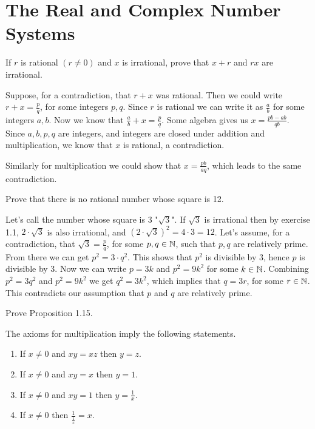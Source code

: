 \section{The Real and Complex Number Systems}

\begin{problem}
  If $r$ is rational $(r \neq 0)$ and $x$ is irrational, prove that $x + r$ and $rx$ are irrational.
\end{problem}

\begin{solution}
  Suppose, for a contradiction, that $r + x$ was rational.
  Then we could write $r + x = \frac{p}{q}$, for some integers $p,q$.
  Since $r$ is rational we can write it as $\frac{a}{b}$ for some integers $a,b$.
  Now we know that $\frac{a}{b} + x = \frac{p}{q}$.
  Some algebra gives us $x=\frac{pb-ab}{qb}$.
  Since $a, b, p, q$ are integers, and integers are closed under addition and multiplication, we know that $x$ is rational, a contradiction.

  Similarly for multiplication we could show that $x=\frac{pb}{aq}$, which leads to the same contradiction.
\end{solution}

\begin{problem}
  Prove that there is no rational number whose square is 12.
\end{problem}

\begin{solution}
  Let's call the number whose square is $3$ "$\sqrt{3}$".
  If $\sqrt{3}$ is irrational then by exercise 1.1, $2 \cdot \sqrt{3}$ is also irrational, and $(2 \cdot \sqrt{3})^2 = 4 \cdot 3 = 12$.
  Let's assume, for a contradiction, that $\sqrt{3} = \frac{p}{q}$, for some $p,q \in \mathbb{N}$, such that $p,q$ are relatively prime.
  From there we can get $p^2 = 3 \cdot q^2$. This shows that $p^2$ is divisible by $3$, hence $p$ is divisible by 3. Now we can write $p = 3k$ and $p^2 = 9k^2$ for some $k \in \mathbb{N}$.
  Combining $p^2 = 3q^2$ and $p^2 = 9k^2$ we get $q^2 = 3k^2$, which implies that $q = 3r$, for some $r \in \mathbb{N}$.
  This contradicts our assumption that $p$ and $q$ are relatively prime.
\end{solution}

\begin{problem}
  Prove Proposition 1.15.

  The axioms for multiplication imply the following statements.
  \begin{enumerate}[label=(\alph*)]
    \item If $x \neq 0$ and $xy = xz$ then $y = z$.
    \item If $x \neq 0$ and $xy = x$ then $y = 1$.
    \item If $x \neq 0$ and $xy = 1$ then $y = \frac{1}{x}$.
    \item If $x \neq 0$ then $\frac{1}{\frac{1}{x}} = x$.
  \end{enumerate}
\end{problem}

